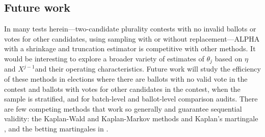 \documentclass[12pt,runningheads]{llncs}
\begin{document}
{\subsection{Future work}
In many tests herein---two-candidate plurality contests with no invalid ballots or votes for other candidates, using
sampling with or without replacement---ALPHA with a shrinkage and truncation estimator is competitive with other methods.
It would be interesting
to explore a broader variety of estimates of $\theta_j$ based on $\eta$ and $X^{j-1}$and their operating characteristics.
Future work will study the efficiency of these methods in elections where there are ballots with no
valid vote in the contest and ballots with votes for other candidates in the contest,
when the sample is stratified, and for batch-level and ballot-level comparison audits.
There are few competing methods that work so generally and guarantee sequential validity: the 
Kaplan-Wald and Kaplan-Markov methods and Kaplan's martingale \cite{stark09,stark20},
and the betting martingales in \cite{waudby-smithEtal21}.

}
\end{document}
